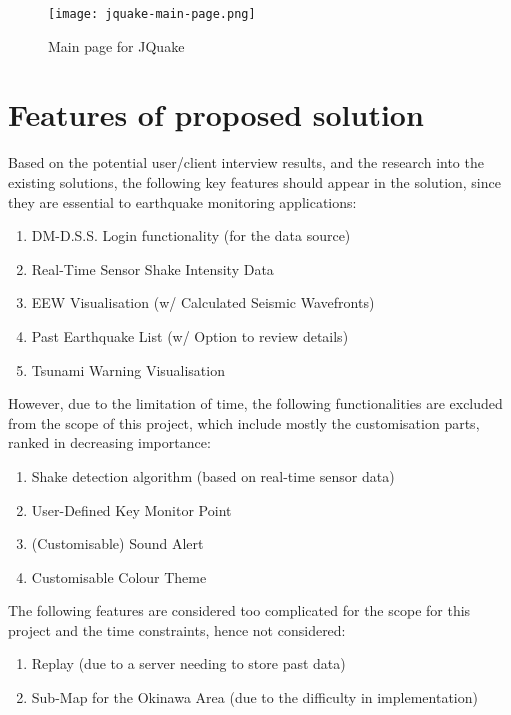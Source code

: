 \begin{figure}[htp]
    \centering

    \texttt{[image: jquake-main-page.png]}
    \caption{Main page for JQuake}
    \label{fig:jquake-main-page}
\end{figure}

\section{Features of proposed solution}

Based on the potential user/client interview results, and the research into the existing solutions, the following key features should appear in the solution, since they are essential to earthquake monitoring applications:
\begin{enumerate}
    \item DM-D.S.S. Login functionality (for the data source)
    \item Real-Time Sensor Shake Intensity Data
    \item EEW Visualisation (w/ Calculated Seismic Wavefronts)
    \item Past Earthquake List (w/ Option to review details)
    \item Tsunami Warning Visualisation
\end{enumerate}

However, due to the limitation of time, the following functionalities are excluded from the scope of this project, which include mostly the customisation parts, ranked in decreasing importance:
\begin{enumerate}
    \item Shake detection algorithm (based on real-time sensor data)
    \item User-Defined Key Monitor Point
    \item (Customisable) Sound Alert
    \item Customisable Colour Theme
\end{enumerate}

The following features are considered too complicated for the scope for this project and the time constraints, hence not considered:
\begin{enumerate}
    \item Replay (due to a server needing to store past data)
    \item Sub-Map for the Okinawa Area (due to the difficulty in implementation)
\end{enumerate}

